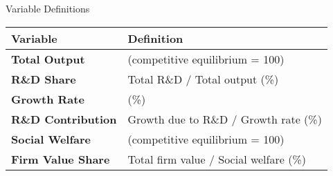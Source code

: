 \documentclass[
  10pt,               %
  aspectratio=169,     %
]{beamer}
\theoremstyle{plain}
\begin{document}
\begin{frame}{Variable Definitions}
  \renewcommand{\arraystretch}{1.5}
  \begin{center}
    \begin{tabular}{@{}ll@{}}
      \toprule
      \textbf{Variable}          & \textbf{Definition}                    \\
      \midrule
      \textbf{Total Output}      & (competitive equilibrium = 100)        \\[1ex]
      \textbf{R\&D Share}        & Total R\&D / Total output (\%)         \\[1ex]
      \textbf{Growth Rate}       & (\%)                                   \\[1ex]
      \textbf{R\&D Contribution} & Growth due to R\&D / Growth rate (\%)  \\[1ex]
      \textbf{Social Welfare}    & (competitive equilibrium = 100)        \\[1ex]
      \textbf{Firm Value Share}  & Total firm value / Social welfare (\%) \\
      \bottomrule
    \end{tabular}
  \end{center}
\end{frame}
\end{document}
